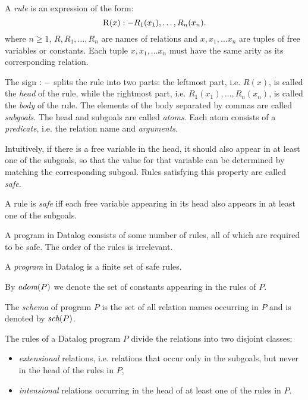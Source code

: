 \begin{defn}[Rule]\label{d:datalogrule}
A \emph{rule} is an expression of the form:
$$ \textsc{R}(x) :- R_1(x_1), \dots, R_n(x_n). $$
where $n \ge 1$, $R, R_1, \dots, R_n$ are names of relations and $x, x_1, \dots x_n$ are tuples of free variables or constants. Each tuple $x, x_1, \dots x_n$ must have the same arity as its corresponding relation.
\end{defn}

The sign $:-$ splits the rule into two parts: the leftmost part, i.e. $R(x)$, is called the \emph{head} of the rule, while the rightmost part, i.e. $R_1(x_1), \dots, R_n(x_n)$, is called the \emph{body} of the rule. The elements of the body separated by commas are called \emph{subgoals}. The head and subgoals are called \emph{atoms}. Each atom consists of a \emph{predicate}, i.e. the relation name and \emph{arguments}.

Intuitively, if there is a free variable in the head, it should also appear in at least one of the subgoals, so that the value for that variable can be determined by matching the corresponding subgoal. Rules satisfying this property are called \emph{safe}.

\begin{defn}\label{d:datalogsaferule}
A rule is \emph{safe} iff each free variable appearing in its head also appears in at least one of the subgoals.
\end{defn}

A program in Datalog consists of some number of rules, all of which are required to be safe. The order of the rules is irrelevant.

\begin{defn}\label{d:datalogprog}
A \emph{program} in Datalog is a finite set of safe rules.
\end{defn}

By $\textit{adom}(P)$ we denote the set of constants appearing in the rules of $P$.

The \emph{schema} of program $P$ is the set of all relation names occurring in $P$ and is denoted by $\textit{sch}(P)$.

\begin{defn}
The rules of a Datalog program $P$ divide the relations into two disjoint classes: 
\begin{itemize}
\item \emph{extensional} relations, i.e. relations that occur only in the subgoals, but never in the head of the rules in $P$,
\item \emph{intensional} relations occurring in the head of at least one of the rules in $P$.
\end{itemize}
\end{defn}

